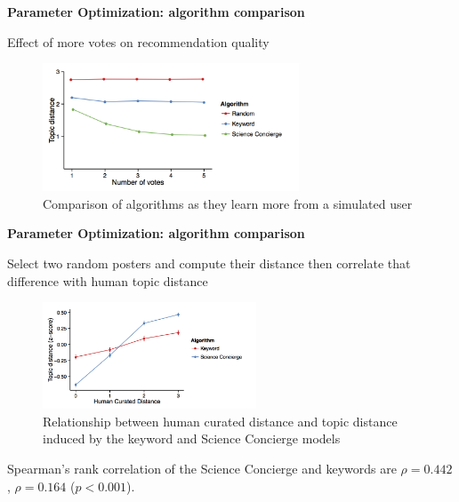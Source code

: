 \begin{frame}{\textbf{Parameter Optimization: algorithm comparison}}

Effect of more votes on recommendation quality

\begin{figure}
\includegraphics[width=3.0in]{images/performance_vs_votes}\\
\tiny{Comparison of algorithms as they learn more from a simulated user}
\end{figure}


\end{frame}


\begin{frame}{\textbf{Parameter Optimization: algorithm comparison}}

Select two random posters and compute their distance then correlate that difference with human topic distance

\begin{figure}
\includegraphics[width=2.5in]{images/human_vs_topic_distance}\\
\tiny{Relationship between human curated distance and topic distance induced by the keyword and Science Concierge models}
\end{figure}

Spearman's rank correlation of the Science Concierge and keywords are $\rho=0.442$, $\rho=0.164$ ($p < 0.001$).

\end{frame}